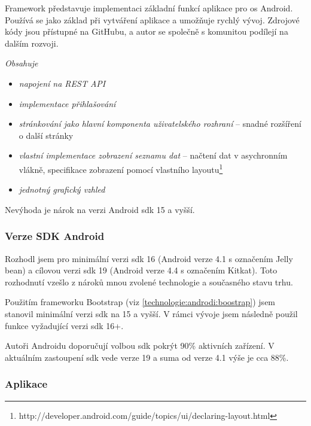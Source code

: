 \documentclass[thesis=B,czech]{FITthesis}[2012/06/26]
\begin{document}
Framework představuje implementaci základní funkcí aplikace pro \acrshort{os} Android. Používá se jako základ při vytváření aplikace a umožňuje rychlý vývoj. Zdrojové kódy jsou přístupné na GitHubu, a autor se společně s komunitou podílejí na dalším rozvoji.\newline

\textit{Obsahuje}
\begin{itemize}[nosep]
	\item \textit{napojení na REST API}
	\item \textit{implementace přihlašování}  
	\item \textit{stránkování jako hlavní komponenta uživatelského rozhraní} -- snadné rozšíření o další stránky
	\item \textit{vlastní implementace zobrazení seznamu dat} -- načtení dat v asychronním vlákně, specifikace zobrazení pomocí vlastního layoutu\footnote{http://developer.android.com/guide/topics/ui/declaring-layout.html}  
	\item \textit{jednotný grafický vzhled}	
\end{itemize}

Nevýhoda je nárok na verzi Android \acrshort{sdk} 15 a vyšší.


\subsubsection {Verze SDK Android}

Rozhodl jsem pro minimální verzi \acrshort{sdk} 16 (Android verze 4.1 s označením Jelly bean) a cílovou verzi \acrshort{sdk} 19 (Android verze 4.4 s označením Kitkat).
Toto rozhodnutí vzešlo z nároků mnou zvolené technologie a současného stavu trhu.

Použitím frameworku Bootstrap (viz \ref{technologie:androdi:boostrap}) jsem stanovil minimální verzi \acrshort{sdk} na 15 a vyšší. V rámci vývoje jsem následně použil funkce vyžadující verzi \acrshort{sdk} 16+.

Autoři Androidu doporučují volbou \acrshort{sdk} pokrýt 90\% aktivních zařízení\cite{android_sdk_recommendation}. V aktuálním zastoupení \acrshort{sdk} vede verze 19 a suma od verze 4.1 výše je cca 88\%\cite{android_sdk_graph}. 



\subsubsection{Aplikace}
\end{document}
